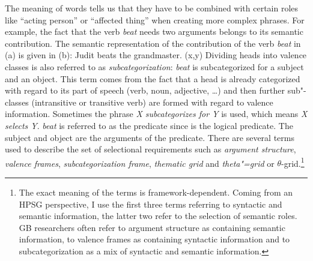 The meaning of words tells us that they have to be combined with certain roles like ``acting person'' or ``affected thing'' when creating more complex phrases.
For example, the fact that the verb \emph{beat} needs two arguments belongs to its semantic
contribution. The semantic representation of the contribution of the verb \emph{beat} in (a)
is given in (b): 
\eal
\ex Judit beats the grandmaster.
\ex {}(x,y)
\zl
\noindent
Dividing heads into valence classes is also referred to as \emph{subcategorization}:\label{Seite-Subkategoriesierung} 
\emph{beat} is subcategorized for a subject and an object.
This term comes from the fact that a head is already categorized with regard to its
part of speech (verb, noun, adjective, \ldots) and then further sub"-classes (\eg intransitive or
transitive verb) are formed with regard to valence information. Sometimes the phrase \emph{X subcategorizes for Y} is used, which means \emph{X selects Y}.
\emph{beat} is referred to as the predicate since 
 is the logical predicate.
The subject and object are the arguments of the predicate. There are several terms used
to describe the set of selectional requirements such
as \emph{argument structure}, \emph{valence frames},
\emph{subcategorization frame}, \emph{thematic grid}
and \emph{theta"=grid} or $\theta$-grid.\footnote{%
The exact meaning of the terms is framework-dependent. Coming from an HPSG perspective, I use the first three terms referring to syntactic and
semantic information, the latter two refer to the selection of semantic roles. GB researchers often
refer to argument structure as containing semantic information, to valence frames as containing
syntactic information and to subcategorization as a mix of syntactic and semantic information.}

